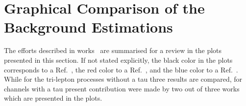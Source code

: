 \clearpage
\newpage
\appendix
\section{Graphical Comparison of the Background Estimations}
\label{app:graphical}
The efforts described in works~\cite{AN2012:248,AN2012:255,AN2012:256} are summarised for 
a review in the plots presented in this section. If not stated explicitly, the black color in the plots corresponds to 
a Ref.~\cite{AN2012:248}, the red color to a Ref.~\cite{AN2012:255}, and the blue color to a Ref.~\cite{AN2012:256}.
While for the tri-lepton processes without a tau three results are compared, for channels with a tau present
contribution were made by two out of three works which are presented in the plots.
